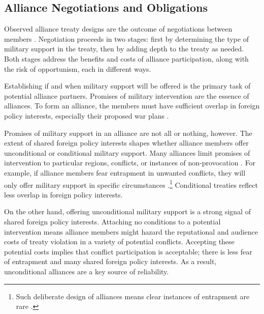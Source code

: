 \documentclass[12pt]{article}
\begin{document}
\subsection{Alliance Negotiations and Obligations}

Observed alliance treaty designs are the outcome of negotiations between members \citep{Poast2019a}.  
Negotiation proceeds in two stages: first by determining the type of military support in the treaty, then by adding depth to the treaty as needed. 
Both stages address the benefits and costs of alliance participation, along with the risk of opportunism, each in different ways. 


Establishing if and when military support will be offered is the primary task of potential alliance partners. 
Promises of military intervention are the essence of alliances. 
To form an alliance, the members must have sufficient overlap in foreign policy interests, especially their proposed war plans \citep{Morrow1991, Smith1995, FordhamPoast2014, Poast2019a}.  


Promises of military support in an alliance are not all or nothing, however. 
The extent of shared foreign policy interests shapes whether alliance members offer unconditional or conditional military support.
Many alliances limit promises of intervention to particular regions, conflicts, or instances of non-provocation \citep{Leedsetal2000}. 
For example, if alliance members fear entrapment in unwanted conflicts, they will only offer military support in specific circumstances \citep{Kim2011, Benson2012}.\footnote{Such deliberate design of alliances means clear instances of entrapment are rare \citep{Beckley2015}.} 
Conditional treaties reflect less overlap in foreign policy interests. 


On the other hand, offering unconditional military support is a strong signal of shared foreign policy interests. 
Attaching no conditions to a potential intervention means alliance members might hazard the reputational \citep{Gibler2008, Crescenzietal2012} and audience \citep{Fearon1997} costs of treaty violation in a variety of potential conflicts. 
Accepting these potential costs implies that conflict participation is acceptable; there is less fear of entrapment and many shared foreign policy interests. 
As a result, unconditional alliances are a key source of reliability. 
\end{document}
